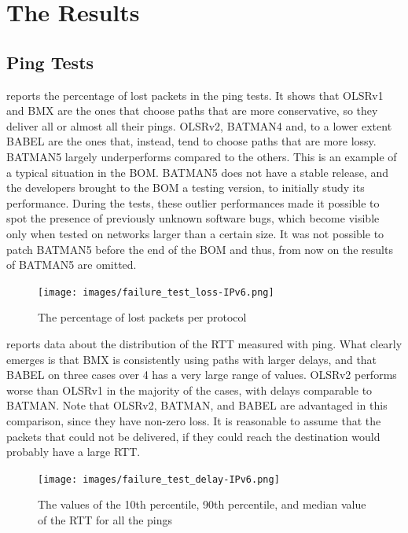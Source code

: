 \documentclass[10pt,onecolumn]{paper}
\begin{document}
\section{The Results}

\subsection{Ping Tests}

 reports the percentage of lost packets in the ping tests. It
shows that OLSRv1 and BMX are the ones that choose paths that are more
conservative, so they deliver all or almost all their pings. OLSRv2, BATMAN4
and, to a lower extent BABEL are the ones that, instead, tend to choose paths
that are more lossy. BATMAN5 largely underperforms compared to the others. This
is an example of a typical situation in the BOM. BATMAN5 does not have a stable
release, and the developers brought to the BOM a testing version, to initially
study its performance. During the tests, these outlier performances made it
possible to spot the presence of previously unknown software bugs, which become
visible only when tested on networks larger than a certain size. 
It was not possible to patch BATMAN5 before the end of the BOM and thus, from
now on the results of BATMAN5 are omitted. 

\begin{figure}
  \centering
  \texttt{[image: images/failure\_test\_loss-IPv6.png]}
  \caption{The percentage of lost packets per protocol}
    \label{fig:pingloss}
\end{figure}

 reports data about the distribution of the RTT measured
with ping. What clearly emerges is that BMX is consistently using paths with
larger delays, and that BABEL on three cases over 4 has a very large range of
values. OLSRv2 performs worse than OLSRv1 in the majority of the cases, with
delays comparable to BATMAN. Note that OLSRv2, BATMAN, and BABEL are advantaged
in this comparison, since they have non-zero loss. It is reasonable to assume
that the packets that could not be delivered, if they could reach the
destination would probably have a large RTT.

\begin{figure}
  \centering
  \texttt{[image: images/failure\_test\_delay-IPv6.png]}
  \caption{The values of the 10th percentile, 90th percentile, and median value
    of the RTT for all the pings}
  \label{fig:delaydist}
\end{figure}
\end{document}
